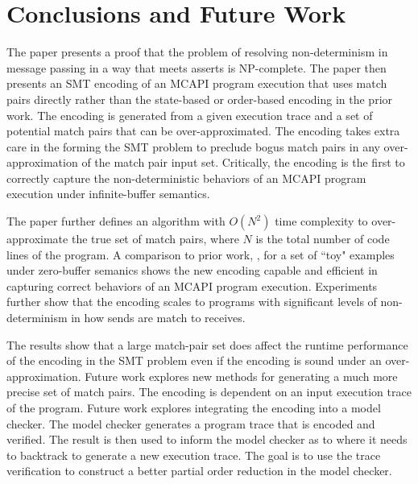\section{Conclusions and Future Work}
The paper presents a proof that the problem of resolving
non-determinism in message passing in a way that meets asserts is
NP-complete. The paper then presents an SMT encoding of an MCAPI
program execution that uses match pairs directly rather than the
state-based or order-based encoding in the prior work. The encoding is
generated from a given execution trace and a set of potential match
pairs that can be over-approximated. The encoding takes extra care in
the forming the SMT problem to preclude bogus match pairs in any
over-approximation of the match pair input set. Critically, the
encoding is the first to correctly capture the non-deterministic
behaviors of an MCAPI program execution under infinite-buffer
semantics.

The paper further defines an algorithm with $O(N^2)$ time complexity
to over-approximate the true set of match pairs, where $N$ is the
total number of code lines of the program. A comparison to prior work,
\cite{elwakil:padtad10}, for a set of ``toy" examples under
zero-buffer semanics shows the new encoding capable and efficient in
capturing correct behaviors of an MCAPI program execution. Experiments
further show that the encoding scales to programs with significant levels of
non-determinism in how sends are match to receives.

The results show that a large match-pair set does affect the runtime
performance of the encoding in the SMT problem even if the encoding is
sound under an over-approximation. Future work explores new methods
for generating a much more precise set of match pairs. The encoding is
dependent on an input execution trace of the program. Future work
explores integrating the encoding into a model checker. The model
checker generates a program trace that is encoded and verified. The
result is then used to inform the model checker as to where it needs
to backtrack to generate a new execution trace. The goal is to use the
trace verification to construct a better partial order reduction in
the model checker.


